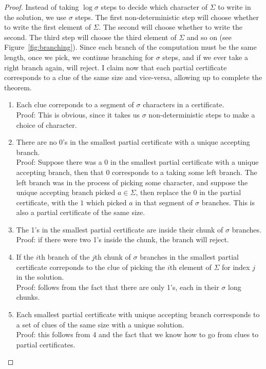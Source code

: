 \documentclass[runningheads,a4paper]{llncs}
\begin{document}
\begin{proof}
Instead of taking $\log \sigma$ steps to decide which character of $\Sigma$ to write in the solution, we use $\sigma$ steps. The first non-deterministic step will choose whether to write the first element of $\Sigma$. The second will choose whether to write the second. The third step will choose the third element of $\Sigma$ and so on (see Figure~\ref{fig:branching}). Since each branch of the computation must be the same length, once we pick, we continue branching for $\sigma$ steps, and if we ever take a right branch again, will reject. I claim now that each partial certificate corresponds to a clue of the same size and vice-versa, allowing up to complete the theorem.
\begin{enumerate}
\item Each clue correponds to a segment of $\sigma$ characters in a certificate.\\
Proof: This is obvious, since it takes us $\sigma$ non-deterministic steps to make a choice of character.
\item There are no 0's in the smallest partial certificate with a unique accepting branch.\\
Proof: Suppose there was a 0 in the smallest partial certificate with a unique accepting branch, then that 0 corresponds to a taking some left branch. The left branch was in the process of picking some character, and suppose the unique accepting branch picked $a \in \Sigma$, then replace the 0 in the partial certificate, with the $1$ which picked $a$ in that segment of $\sigma$ branches. This is also a partial certificate of the same size. 
\item The 1's in the smallest partial certificate are inside their chunk of $\sigma$ branches.\\
Proof: if there were two 1's inside the chunk, the branch will reject.
\item If the $i$th branch of the $j$th chunk of $\sigma$ branches in the smallest partial certificate correponds to the clue of picking the $i$th element of $\Sigma$ for index $j$ in the solution.\\
Proof: follows from the fact that there are only 1's, each in their $\sigma$ long chunks.
\item Each smallest partial certificate with unique accepting branch corresponds to a set of clues of the same size with a unique solution. \\
Proof: this follows from 4 and the fact that we know how to go from clues to partial certificates.
\end{enumerate}
\end{proof}
\end{document}
